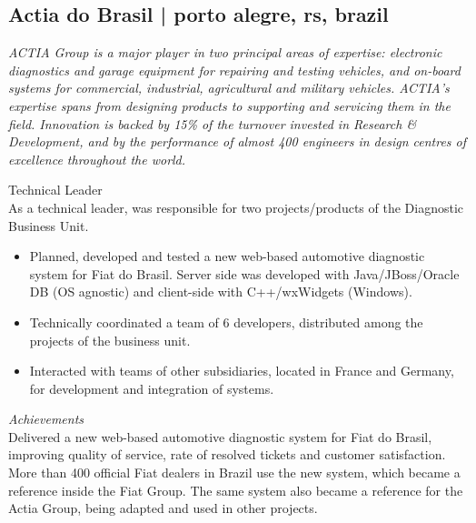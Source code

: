 \documentclass[10pt,a4paper]{article}
\newcommand{\years}[1]{\marginnote{{\small #1}}}
\begin{document}
{\subsection*{Actia do Brasil | {\footnotesize{porto alegre, rs, brazil}}}
{\footnotesize\textit{ACTIA Group is a major player in two principal areas of expertise: electronic diagnostics and garage equipment for repairing and testing vehicles, and on-board systems for commercial, industrial, agricultural and military vehicles. ACTIA's expertise spans from designing products to supporting and servicing them in the field. Innovation is backed by 15\% of the turnover invested in Research \& Development, and by the performance of almost 400 engineers in design centres of excellence throughout the world.}}
\medskip

\years{Apr 2007 -\\ Jul 2010}Technical Leader\\
As a technical leader, was responsible for two projects/products of the Diagnostic Business Unit.
\begin{itemize}
  \item Planned, developed and tested a new web-based automotive diagnostic system for Fiat do Brasil. Server side was developed with Java/JBoss/Oracle DB (OS agnostic) and client-side with C++/wxWidgets (Windows).
  \item Technically coordinated a team of 6 developers, distributed among the projects of the business unit.
  \item Interacted with teams of other subsidiaries, located in France and Germany, for development and integration of systems.
\end{itemize}
\emph{Achievements}\\
Delivered a new web-based automotive diagnostic system for Fiat do Brasil, improving quality of service, rate of resolved tickets and customer satisfaction. More than 400 official Fiat dealers in Brazil use the new system, which became a reference inside the Fiat Group. The same system also became a reference for the Actia Group, being adapted and used in other projects.\\

}
\end{document}
